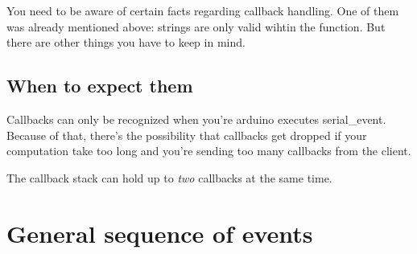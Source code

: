 You need to be aware of certain facts regarding callback handling. One of them was already mentioned above\+: strings are only valid wihtin the function. But there are other things you have to keep in mind.

\subsection*{When to expect them}

Callbacks can only be recognized when you're arduino executes {\ttfamily serial\+\_\+event}. Because of that, there's the possibility that callbacks get dropped if your computation take too long and you're sending too many callbacks from the client.

 The callback stack can hold up to {\itshape two} callbacks at the same time.

\section*{General sequence of events}

